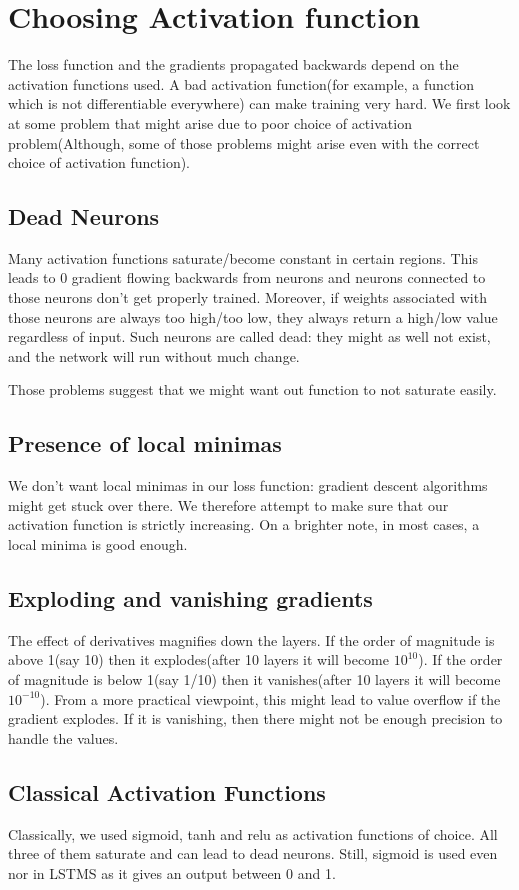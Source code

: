 \section{Choosing Activation function}
The loss function and the gradients propagated backwards depend on the activation functions used. A bad activation function(for example, a function which is not differentiable everywhere) can make training very hard. We first look at some problem that might arise due to poor choice of activation problem(Although, some of those problems might arise even with the correct choice of activation function).
\subsection{Dead Neurons}
Many activation functions saturate/become constant in certain regions. This leads to 0 gradient flowing backwards from neurons and neurons connected to those neurons don't get properly trained. Moreover, if weights associated with those neurons are always too high/too low, they always return a high/low value regardless of input. Such neurons are called dead: they might as well not exist, and the network will run without much change.

Those problems suggest that we might want out function to not saturate easily.
\subsection{Presence of local minimas}
We don't want local minimas in our loss function: gradient descent algorithms might get stuck over there. We therefore attempt to make sure that our activation function is strictly increasing. On a brighter note, in most cases, a local minima is good enough.
\subsection{Exploding and vanishing gradients}
The effect of derivatives magnifies
down the layers. If the order of
magnitude is above 1(say 10) then it
explodes(after 10 layers it will
become $10^{10}$). If the order of
magnitude is below 1(say 1/10) then
it vanishes(after 10 layers it will
become $10^{-10}$). From a more practical viewpoint,
this might lead to value overflow if the
gradient explodes. If it is vanishing,
then there might not be enough
precision to handle the values.

\subsection{Classical Activation Functions}
Classically, we used sigmoid, tanh and relu as activation functions of choice. All three of them  saturate and can lead to dead neurons. Still, sigmoid is used even nor in LSTMS as it gives an output between 0 and 1. 
